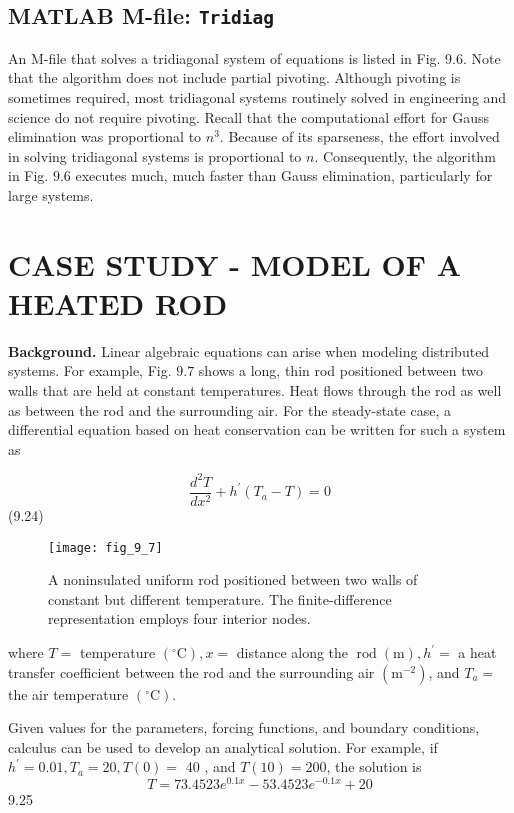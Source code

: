 \documentclass[../main.tex]{subfiles}
\begin{document}
\subsection{MATLAB M-file: \texttt{Tridiag}}

An M-file that solves a tridiagonal system of equations is listed in Fig. 9.6. Note that the algorithm does not include partial pivoting. Although pivoting is sometimes required, most tridiagonal systems routinely solved in engineering and science do not require pivoting.
Recall that the computational effort for Gauss elimination was proportional to $n^{3}$. Because of its sparseness, the effort involved in solving tridiagonal systems is proportional to $n$. Consequently, the algorithm in Fig. $9.6$ executes much, much faster than Gauss elimination, particularly for large systems.
\\

\section{\textbf{CASE STUDY} - MODEL OF A HEATED ROD}

\textbf{Background.} Linear algebraic equations can arise when modeling distributed systems. For example, Fig. $9.7$ shows a long, thin rod positioned between two walls that are held at constant temperatures. Heat flows through the rod as well as between the rod and the surrounding air. For the steady-state case, a differential equation based on heat conservation can be written for such a system as

$$
\frac{d^{2} T}{d x^{2}}+h^{\prime}\left(T_{a}-T\right)=0
$$ \hfill{(9.24)}

\begin{figure}[H]
    \centering
    \texttt{[image: fig\_9\_7]}
    \caption{\textsf{A noninsulated uniform rod positioned between two walls of constant but different temperature.
    The finite-difference representation employs four interior nodes.}}
    \label{fig:fig_9_7}
\end{figure}

where $T=$ temperature $\left({ }^{\circ} \mathrm{C}\right), x=$ distance along the $\operatorname{rod}(\mathrm{m}), h^{\prime}=$ a heat transfer coefficient between the rod and the surrounding air $\left(\mathrm{m}^{-2}\right)$, and $T_{a}=$ the air temperature $\left({ }^{\circ} \mathrm{C}\right)$.

Given values for the parameters, forcing functions, and boundary conditions, calculus can be used to develop an analytical solution. For example, if $h^{\prime}=0.01, T_{a}=20, T(0)=$ 40 , and $T(10)=200$, the solution is
$$
T=73.4523 e^{0.1 x}-53.4523 e^{-0.1 x}+20
$$ \hfill{9.25}
\end{document}
